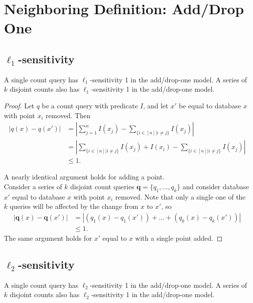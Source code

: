 \documentclass[11pt]{scrartcl} %
\begin{document}
\section{Neighboring Definition: Add/Drop One}
\subsection{$\ell_1$-sensitivity}
\begin{theorem}
\label{thm:addDropL1}
A single count query has $\ell_1$-sensitivity 1 in the add/drop-one model. A series of $k$ disjoint counts also has $\ell_1$-sensitivity 1 in the add/drop-one model.
\end{theorem}

\begin{proof}
Let $q$ be a count query with predicate $I$, and let $x'$ be equal to database $x$ with point $x_i$ removed. Then 
\begin{align*}
\left \vert q(x) - q(x') \right\vert &= \left\vert \sum_{j=1}^n I(x_j) - \sum_{\{ i \in [n] \vert i \ne j\}} I(x_j) \right\vert\\
	&= \left\vert \sum_{\{ i \in [n] \vert i \ne j\}} I(x_j) + I(x_i) - \sum_{\{ i \in [n] \vert i \ne j\}} I(x_j) \right\vert\\
	&\le 1.
\end{align*}

A nearly identical argument holds for adding a point. \\

Consider a series of $k$ disjoint count queries $\mathbf{q} = \{q_1, \ldots, q_k\}$ and consider database $x'$ equal to database $x$ with point $x_i$ removed. Note that only a single one of the $k$ queries will be affected by the change from $x$ to $x'$, so
\begin{align*}
\left\vert \mathbf{q}(x) - \mathbf{q}(x') \right\vert &= \left\vert \left(q_1(x) - q_1(x')\right) + \ldots + \left(q_k(x) - q_k(x')\right) \right\vert \\
	&\le 1.
\end{align*}
The same argument holds for $x'$ equal to $x$ with a single point added.
\end{proof}
\subsection{$\ell_2$-sensitivity}
\begin{theorem}
A single count query has $\ell_2$-sensitivity 1 in the add/drop-one model. A series of $k$ disjoint counts also has $\ell_2$-sensitivity 1 in the add/drop-one model.
\end{theorem}

% 
% 
\end{document}
